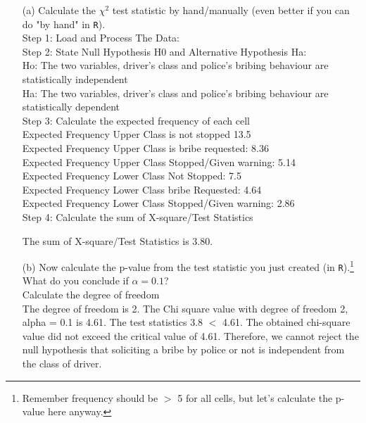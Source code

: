 \documentclass[12pt,letterpaper]{article}
\begin{document}
\begin{enumerate}
	
	\item [(a)]
	Calculate the $\chi^2$ test statistic by hand/manually (even better if you can do "by hand" in \texttt{R}).\\
	\vspace{7cm}
	Step 1: Load and Process The Data:\\ 
	
	Step 2: State Null Hypothesis H0 and Alternative Hypothesis Ha:\\
	Ho: The two variables, driver's class and police's bribing behaviour are statistically independent\\
	Ha: The two variables, driver's class and police's bribing behaviour are statistically dependent\\
	Step 3: Calculate the expected frequency of each cell\\
	
	Expected Frequency Upper Class is not stopped 13.5\\
	Expected Frequency Upper Class is bribe requested: 8.36\\
	Expected Frequency Upper Class Stopped/Given warning: 5.14\\
	Expected Frequency Lower Class Not Stopped: 7.5\\
	Expected Frequency Lower Class bribe Requested: 4.64 \\
	Expected Frequency Lower Class Stopped/Given warning: 2.86\\
	Step 4: Calculate the sum of X-square/Test Statistics
	
	The sum of X-square/Test Statistics is 3.80.
	
	
	\item [(b)]
	Now calculate the p-value from the test statistic you just created (in \texttt{R}).\footnote{Remember frequency should be $>$ 5 for all cells, but let's calculate the p-value here anyway.}  What do you conclude if $\alpha = 0.1$?\\
	Calculate the degree of freedom\\
	
	The degree of freedom is 2.
	The Chi square value with degree of freedom 2, alpha = 0.1 is 4.61.	The test statistics 3.8 $<$ 4.61. The obtained chi-square value did not exceed the critical value of 4.61. Therefore, we cannot reject the null hypothesis that soliciting a bribe by police or not is independent from the class of driver.
	

\end{enumerate}
\end{document}
